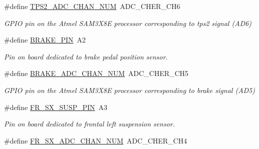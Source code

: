 \begin{DoxyCompactItemize}
\#define \mbox{\hyperlink{group___board__pinout__group_ga4cecb8c10512873904099a1a88d69ed3}{T\+P\+S2\+\_\+\+A\+D\+C\+\_\+\+C\+H\+A\+N\+\_\+\+N\+UM}}~A\+D\+C\+\_\+\+C\+H\+E\+R\+\_\+\+C\+H6
\begin{DoxyCompactList}\small\item\em G\+P\+IO pin on the Atmel S\+A\+M3\+X8E processor corresponding to tps2 signal (A\+D6) \end{DoxyCompactList}\item 
\mbox{\label{group___board__pinout__group_gad632b56bf4c6259a390c3db91607078e}} 
\#define \mbox{\hyperlink{group___board__pinout__group_gad632b56bf4c6259a390c3db91607078e}{B\+R\+A\+K\+E\+\_\+\+P\+IN}}~A2
\begin{DoxyCompactList}\small\item\em Pin on board dedicated to brake pedal position sensor. \end{DoxyCompactList}\item 
\mbox{\label{group___board__pinout__group_ga310547321c4a016c4ad19922920fadfd}} 
\#define \mbox{\hyperlink{group___board__pinout__group_ga310547321c4a016c4ad19922920fadfd}{B\+R\+A\+K\+E\+\_\+\+A\+D\+C\+\_\+\+C\+H\+A\+N\+\_\+\+N\+UM}}~A\+D\+C\+\_\+\+C\+H\+E\+R\+\_\+\+C\+H5
\begin{DoxyCompactList}\small\item\em G\+P\+IO pin on the Atmel S\+A\+M3\+X8E processor corresponding to brake signal (A\+D5) \end{DoxyCompactList}\item 
\mbox{\label{group___board__pinout__group_ga26973930bb94d493970560d50ed5388f}} 
\#define \mbox{\hyperlink{group___board__pinout__group_ga26973930bb94d493970560d50ed5388f}{F\+R\+\_\+\+S\+X\+\_\+\+S\+U\+S\+P\+\_\+\+P\+IN}}~A3
\begin{DoxyCompactList}\small\item\em Pin on board dedicated to frontal left suspension sensor. \end{DoxyCompactList}\item 
\mbox{\label{group___board__pinout__group_gab536d8e8e876dfd8764cc1d31620803a}} 
\#define \mbox{\hyperlink{group___board__pinout__group_gab536d8e8e876dfd8764cc1d31620803a}{F\+R\+\_\+\+S\+X\+\_\+\+A\+D\+C\+\_\+\+C\+H\+A\+N\+\_\+\+N\+UM}}~A\+D\+C\+\_\+\+C\+H\+E\+R\+\_\+\+C\+H4

\end{DoxyCompactItemize}
